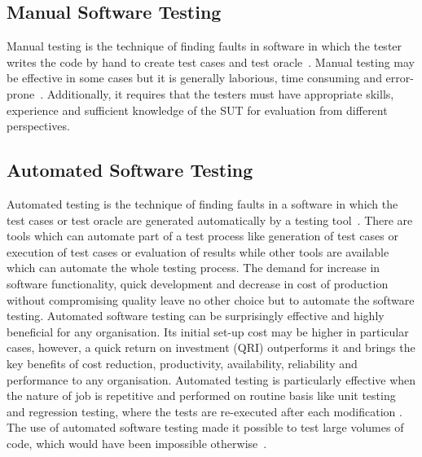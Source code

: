 


\subsection{Manual Software Testing}
Manual testing is the technique of finding faults in software in which the tester writes the code by hand to create test cases and test oracle~\cite{Ciupa2008}. Manual testing may be effective in some cases but it is generally laborious, time consuming and error-prone~\cite{tretmans1999}. Additionally, it requires that the testers must have appropriate skills, experience and sufficient knowledge of the SUT for evaluation from different perspectives.
 
\subsection{Automated Software Testing}
Automated testing is the technique of finding faults in a software in which the test cases or test oracle are generated automatically by a testing tool~\cite{Leitner2007}. There are tools which can automate part of a test process like generation of test cases or execution of test cases or evaluation of results while other tools are available which can automate the whole testing process. 
The demand for increase in software functionality, quick development and decrease in cost of production without compromising quality leave no other choice but to automate the software testing. Automated software testing can be surprisingly effective and highly beneficial for any organisation. Its initial set-up cost may be higher in particular cases, however, a quick return on investment (QRI) outperforms it and brings the key benefits of cost reduction, productivity, availability, reliability and performance to any organisation. Automated testing is particularly effective when the nature of job is repetitive and performed on routine basis like unit testing and regression testing, where the tests are re-executed after each modification \cite{huang2003automated}. The use of automated software testing made it possible to test large volumes of code, which would have been impossible otherwise~\cite{ramamoorthy1975testing}.

